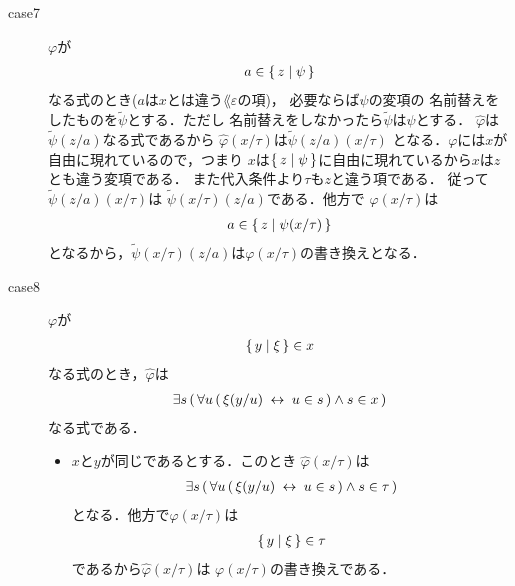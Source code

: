 \begin{metaprf}[第一]
\begin{description}
\begin{description}
					\item[case7] $\varphi$が
						\begin{align}
							a \in \{\, z \mid \psi\, \}
						\end{align}
						なる式のとき($a$は$x$とは違う$\lang{\varepsilon}$の項)，
						必要ならば$\psi$の変項の
						名前替えをしたものを$\widetilde{\psi}$とする．ただし
						名前替えをしなかったら$\widetilde{\psi}$は$\psi$とする．
						$\widehat{\varphi}$は$\widetilde{\psi}(z/a)$なる式であるから
						$\widehat{\varphi}(x/\tau)$は$\widetilde{\psi}(z/a)(x/\tau)$
						となる．$\varphi$には$x$が自由に現れているので，つまり
						$x$は$\{\, z \mid \psi\, \}$に自由に現れているから$x$は$z$とも違う変項である．
						また代入条件より$\tau$も$z$と違う項である．
						従って$\widetilde{\psi}(z/a)(x/\tau)$は
						$\widetilde{\psi}(x/\tau)(z/a)$である．他方で
						$\varphi(x/\tau)$は
						\begin{align}
							a \in \{\, z \mid \psi(x/\tau)\, \}
						\end{align}
						となるから，$\widetilde{\psi}(x/\tau)(z/a)$は$\varphi(x/\tau)$の書き換えとなる．
					
					\item[case8] $\varphi$が
						\begin{align}
							\{\, y \mid \xi\, \} \in x
						\end{align}
						なる式のとき，$\widehat{\varphi}$は
						\begin{align}
							\exists s\, (\, \forall u\, (\, \xi(y/u) \hspace{0.25em}\leftrightarrow\hspace{0.25em} u \in s\, ) \wedge s \in x\, )
						\end{align}
						なる式である．
						\begin{itemize}
							\item $x$と$y$が同じであるとする．このとき
								$\widehat{\varphi}(x/\tau)$は
								\begin{align}
									\exists s\, (\, \forall u\, (\, \xi(y/u) \hspace{0.25em}\leftrightarrow\hspace{0.25em} u \in s\, ) \wedge s \in \tau\, )
								\end{align}
								となる．他方で$\varphi(x/\tau)$は
								\begin{align}
									\{\, y \mid \xi\, \} \in \tau
								\end{align}
								であるから$\widehat{\varphi}(x/\tau)$は
								$\varphi(x/\tau)$の書き換えである．
								

\end{itemize}
\end{description}
\end{description}
\end{metaprf}
